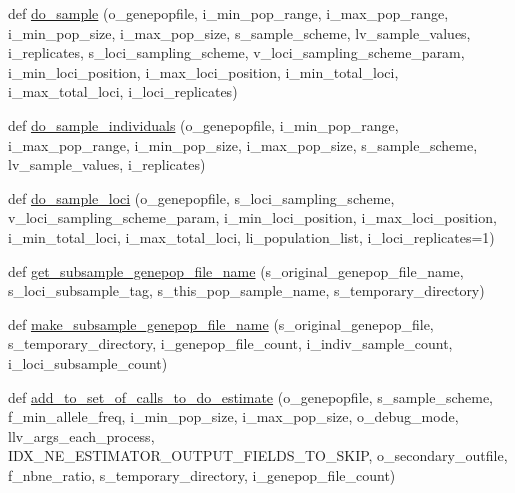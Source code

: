 \begin{DoxyCompactItemize}
\item 
def \hyperlink{namespacenegui_1_1pgdriveneestimator_a74f962e4a6815d8acc2e23c9ad146d0d}{do\+\_\+sample} (o\+\_\+genepopfile, i\+\_\+min\+\_\+pop\+\_\+range, i\+\_\+max\+\_\+pop\+\_\+range, i\+\_\+min\+\_\+pop\+\_\+size, i\+\_\+max\+\_\+pop\+\_\+size, s\+\_\+sample\+\_\+scheme, lv\+\_\+sample\+\_\+values, i\+\_\+replicates, s\+\_\+loci\+\_\+sampling\+\_\+scheme, v\+\_\+loci\+\_\+sampling\+\_\+scheme\+\_\+param, i\+\_\+min\+\_\+loci\+\_\+position, i\+\_\+max\+\_\+loci\+\_\+position, i\+\_\+min\+\_\+total\+\_\+loci, i\+\_\+max\+\_\+total\+\_\+loci, i\+\_\+loci\+\_\+replicates)
\item 
def \hyperlink{namespacenegui_1_1pgdriveneestimator_aa663cfeded8b8a3710d1a11192f12581}{do\+\_\+sample\+\_\+individuals} (o\+\_\+genepopfile, i\+\_\+min\+\_\+pop\+\_\+range, i\+\_\+max\+\_\+pop\+\_\+range, i\+\_\+min\+\_\+pop\+\_\+size, i\+\_\+max\+\_\+pop\+\_\+size, s\+\_\+sample\+\_\+scheme, lv\+\_\+sample\+\_\+values, i\+\_\+replicates)
\item 
def \hyperlink{namespacenegui_1_1pgdriveneestimator_a408b2c39ad32bd720e35f2eace94509c}{do\+\_\+sample\+\_\+loci} (o\+\_\+genepopfile, s\+\_\+loci\+\_\+sampling\+\_\+scheme, v\+\_\+loci\+\_\+sampling\+\_\+scheme\+\_\+param, i\+\_\+min\+\_\+loci\+\_\+position, i\+\_\+max\+\_\+loci\+\_\+position, i\+\_\+min\+\_\+total\+\_\+loci, i\+\_\+max\+\_\+total\+\_\+loci, li\+\_\+population\+\_\+list, i\+\_\+loci\+\_\+replicates=1)
\item 
def \hyperlink{namespacenegui_1_1pgdriveneestimator_af559a2d83516e3fb3fcebbfcdc96881b}{get\+\_\+subsample\+\_\+genepop\+\_\+file\+\_\+name} (s\+\_\+original\+\_\+genepop\+\_\+file\+\_\+name, s\+\_\+loci\+\_\+subsample\+\_\+tag, s\+\_\+this\+\_\+pop\+\_\+sample\+\_\+name, s\+\_\+temporary\+\_\+directory)
\item 
def \hyperlink{namespacenegui_1_1pgdriveneestimator_a9c650be4ed8ae5fa5e599523c22273bd}{make\+\_\+subsample\+\_\+genepop\+\_\+file\+\_\+name} (s\+\_\+original\+\_\+genepop\+\_\+file, s\+\_\+temporary\+\_\+directory, i\+\_\+genepop\+\_\+file\+\_\+count, i\+\_\+indiv\+\_\+sample\+\_\+count, i\+\_\+loci\+\_\+subsample\+\_\+count)
\item 
def \hyperlink{namespacenegui_1_1pgdriveneestimator_a0f589286698490f5054d972daa7c9160}{add\+\_\+to\+\_\+set\+\_\+of\+\_\+calls\+\_\+to\+\_\+do\+\_\+estimate} (o\+\_\+genepopfile, s\+\_\+sample\+\_\+scheme, f\+\_\+min\+\_\+allele\+\_\+freq, i\+\_\+min\+\_\+pop\+\_\+size, i\+\_\+max\+\_\+pop\+\_\+size, o\+\_\+debug\+\_\+mode, llv\+\_\+args\+\_\+each\+\_\+process, I\+D\+X\+\_\+\+N\+E\+\_\+\+E\+S\+T\+I\+M\+A\+T\+O\+R\+\_\+\+O\+U\+T\+P\+U\+T\+\_\+\+F\+I\+E\+L\+D\+S\+\_\+\+T\+O\+\_\+\+S\+K\+IP, o\+\_\+secondary\+\_\+outfile, f\+\_\+nbne\+\_\+ratio, s\+\_\+temporary\+\_\+directory, i\+\_\+genepop\+\_\+file\+\_\+count)

\end{DoxyCompactItemize}

